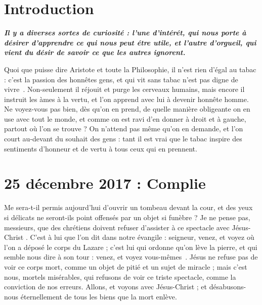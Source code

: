 \documentclass[a4paper,footinbib,final,openany,final,12pt]{book}
\begin{document}
\section{Introduction}
\begin{flushright}
\emph{\textbf{\small{Il y a diverses sortes de curiosit{\'{e}} : l'une d'int{\'{e}}r{\'{e}}t, qui nous porte {\`{a}} d{\'{e}}sirer d'apprendre ce qui nous peut {\'{e}}tre utile, et l'autre d'orgueil, qui vient du d{\'{e}}sir de savoir ce que les autres ignorent.}}}
\end{flushright}
Quoi que puisse dire Aristote et toute la Philosophie, il n'est rien d'{\'{e}}gal au tabac : c'est la passion des honn{\^{e}}tes gens, et qui vit sans tabac n'est pas digne de vivre~\cite{Revolution}. Non-seulement il r{\'{e}}jouit et purge les cerveaux humains, mais encore il instruit les {\`{a}}mes {\`{a}} la vertu, et l'on apprend avec lui {\`{a}} devenir honn{\^{e}}te homme. Ne voyez-vous pas bien, d{\`{e}}s qu'on en prend, de quelle mani{\`{e}}re obligeante on en use avec tout le monde, et comme on est ravi d'en donner {\`{a}} droit et {\`{a}} gauche, partout o{\`{u}} l'on se trouve ? On n'attend pas m{\^{e}}me qu'on en demande, et l'on court au-devant du souhait des gens : tant il est vrai que le tabac inspire des sentiments d'honneur et de vertu {\`{a}} tous ceux qui en prennent.
\newpage

\section{25 d{\'{e}}cembre 2017 : Complie}

Me sera-t-il permis aujourd'hui d'ouvrir un tombeau devant la cour, et des yeux si d{\'{e}}licats ne seront-ils point offens{\'{e}}s par un objet si fun{\`{e}}bre ? Je ne pense pas, messieurs, que des chr{\'{e}}tiens doivent refuser d'assister {\`{a}} ce spectacle avec J{\'{e}}sus-Christ \cite{Saminadayar}. C'est {\`{a}} lui que l'on dit dans notre {\'{e}}vangile : seigneur, venez, et voyez o{\`{u}} l'on a d{\'{e}}pos{\'{e}} le corps du Lazare ; c'est lui qui ordonne qu'on l{\`{e}}ve la pierre, et qui semble nous dire {\`{a}} son tour : venez, et voyez vous-m{\^{e}}mes~\cite{Parti}. J{\'{e}}sus ne refuse pas de voir ce corps mort, comme un objet de piti{\'{e}} et un sujet de miracle ; mais c'est nous, mortels mis{\'{e}}rables, qui refusons de voir ce triste spectacle, comme la conviction de nos erreurs. Allons, et voyons avec J{\'{e}}sus-Christ ; et d{\'{e}}sabusons-nous {\'{e}}ternellement de tous les biens que la mort enl{\`{e}}ve.
\end{document}
